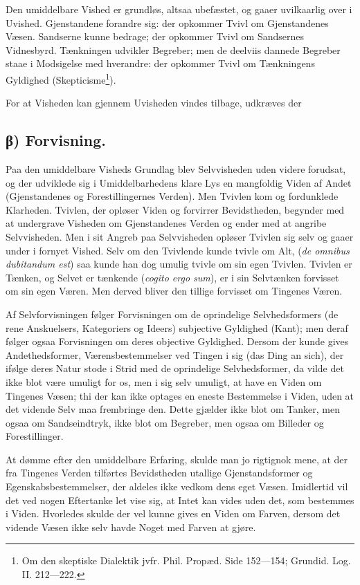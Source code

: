 \documentclass[12pt]{book}
\newcommand{\opage}[1]{\marginnote{\footnotesize\textit{[#1]}}}
\begin{document}
Den umiddelbare Vished er grundløs, altsaa ubefæstet, og gaaer
uvilkaarlig over i Uvished. Gjenstandene forandre sig: der opkommer
Tvivl om Gjenstandenes Væsen. Sandserne kunne bedrage; der opkommer
Tvivl om Sandsernes Vidnesbyrd. Tænkningen udvikler Begreber; men de
deelviis dannede Begreber staae i Modsigelse med hverandre: der
opkommer Tvivl om Tænkningens Gyldighed
(Skepticisme\footnote{Om den skeptiske Dialektik jvfr. Phil. Propæd.
Side 152---154; Grundid. Log. II. 212---222.}).

For at Visheden kan gjennem Uvisheden vindes tilbage, udkræves der

\subsection*{β) Forvisning.}

Paa den umiddelbare Visheds Grundlag blev Selvvisheden uden videre
forudsat, og der udviklede sig i Umiddelbarhedens klare Lys en
mangfoldig Viden af Andet (Gjenstandenes og Forestillingernes
Verden). Men Tvivlen kom og fordunklede Klarheden. Tvivlen, der
opløser Viden og forvirrer Bevidstheden, begynder med at undergrave
Visheden om Gjenstandenes Verden og ender med at angribe
Selvvisheden. Men i sit Angreb paa Selvvisheden opløser Tvivlen sig
selv og gaaer under i fornyet Vished. Selv om den Tvivlende kunde
tvivle om Alt, (\textit{de omnibus dubitandum est}) saa kunde han dog
umulig tvivle om sin egen Tvivlen. Tvivlen er Tænken, og Selvet er
tænkende (\textit{cogito ergo sum}), er i sin Selvtænken forvisset om
sin egen Væren. Men derved bliver den tillige forvisset om Tingenes
Væren.

Af Selvforvisningen følger Forvisningen om de oprindelige
Selvhedsformers (de rene Anskuelsers, Kategoriers og Ideers)
subjective Gyldighed (Kant); men deraf følger ogsaa Forvisningen om
deres objective Gyldighed. Dersom
\opage{3} der kunde gives Andethedsformer, Værensbestemmelser ved Tingen i sig
(das Ding an sich), der ifølge deres Natur stode i Strid med de
oprindelige Selvhedsformer, da vilde det ikke blot være umuligt for
os, men i sig selv umuligt, at have en Viden om Tingenes Væsen; thi
der kan ikke optages en eneste Bestemmelse i Viden, uden at det
vidende Selv maa frembringe den. Dette gjælder ikke blot om Tanker,
men ogsaa om Sandseindtryk, ikke blot om Begreber, men ogsaa om
Billeder og Forestillinger.

At dømme efter den umiddelbare Erfaring, skulde man jo rigtignok
mene, at der fra Tingenes Verden tilførtes Bevidstheden utallige
Gjenstandsformer og Egenskabsbestemmelser, der aldeles ikke vedkom
dens eget Væsen. Imidlertid vil det ved nogen Eftertanke let vise
sig, at Intet kan vides uden det, som bestemmes i Viden. Hvorledes
skulde der vel kunne gives en Viden om Farven, dersom det vidende
Væsen ikke selv havde Noget med Farven at gjøre.
\end{document}
